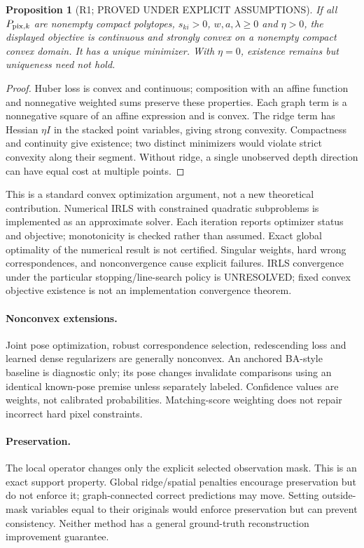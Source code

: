 \documentclass[11pt]{article}
\newtheorem{proposition}{Proposition}
\begin{document}
\begin{proposition}[R1; PROVED UNDER EXPLICIT ASSUMPTIONS]
If all $P_{{\rm pix},k}$ are nonempty compact polytopes, $s_{ki}>0$, $w,a,\lambda\ge0$ and $\eta>0$, the displayed objective is continuous and strongly convex on a nonempty compact convex domain. It has a unique minimizer. With $\eta=0$, existence remains but uniqueness need not hold.
\end{proposition}
\begin{proof}
Huber loss is convex and continuous; composition with an affine function and nonnegative weighted sums preserve these properties. Each graph term is a nonnegative square of an affine expression and is convex. The ridge term has Hessian $\eta I$ in the stacked point variables, giving strong convexity. Compactness and continuity give existence; two distinct minimizers would violate strict convexity along their segment. Without ridge, a single unobserved depth direction can have equal cost at multiple points.
\end{proof}
This is a standard convex optimization argument, not a new theoretical contribution. Numerical IRLS with constrained quadratic subproblems is implemented as an approximate solver. Each iteration reports optimizer status and objective; monotonicity is checked rather than assumed. Exact global optimality of the numerical result is not certified. Singular weights, hard wrong correspondences, and nonconvergence cause explicit failures. IRLS convergence under the particular stopping/line-search policy is UNRESOLVED; fixed convex objective existence is not an implementation convergence theorem.

\paragraph{Nonconvex extensions.}
Joint pose optimization, robust correspondence selection, redescending loss and learned dense regularizers are generally nonconvex. An anchored BA-style baseline is diagnostic only; its pose changes invalidate comparisons using an identical known-pose premise unless separately labeled. Confidence values are weights, not calibrated probabilities. Matching-score weighting does not repair incorrect hard pixel constraints.

\paragraph{Preservation.}
The local operator changes only the explicit selected observation mask. This is an exact support property. Global ridge/spatial penalties encourage preservation but do not enforce it; graph-connected correct predictions may move. Setting outside-mask variables equal to their originals would enforce preservation but can prevent consistency. Neither method has a general ground-truth reconstruction improvement guarantee.
\end{document}
